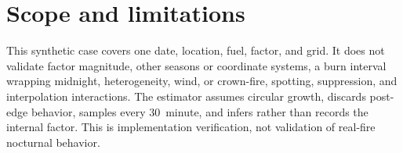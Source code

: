\section{Scope and limitations}

This synthetic case covers one date, location, fuel, factor, and grid. It does not validate factor magnitude, other seasons or coordinate systems, a burn interval wrapping midnight, heterogeneity, wind, or crown-fire, spotting, suppression, and interpolation interactions. The estimator assumes circular growth, discards post-edge behavior, samples every \SI{30}{minute}, and infers rather than records the internal factor. This is implementation verification, not validation of real-fire nocturnal behavior.
